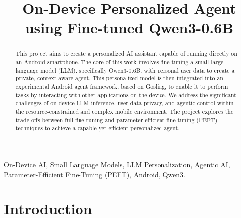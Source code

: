 \documentclass[conference]{IEEEtran}
\begin{document}
\title{On-Device Personalized Agent using Fine-tuned Qwen3-0.6B}

\author{
}

\maketitle

\begin{abstract}
This project aims to create a personalized AI assistant capable of running directly on an Android smartphone. The core of this work involves fine-tuning a small large language model (LLM), specifically Qwen3-0.6B, with personal user data to create a private, context-aware agent. This personalized model is then integrated into an experimental Android agent framework, based on Gosling, to enable it to perform tasks by interacting with other applications on the device. We address the significant challenges of on-device LLM inference, user data privacy, and agentic control within the resource-constrained and complex mobile environment. The project explores the trade-offs between full fine-tuning and parameter-efficient fine-tuning (PEFT) techniques to achieve a capable yet efficient personalized agent.
\end{abstract}

\begin{IEEEkeywords}
On-Device AI, Small Language Models, LLM Personalization, Agentic AI, Parameter-Efficient Fine-Tuning (PEFT), Android, Qwen3.
\end{IEEEkeywords}



\section{Introduction}
\end{document}
